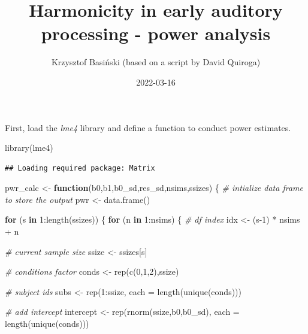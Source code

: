 \documentclass[
]{article}
\title{Harmonicity in early auditory processing - power analysis}
\author{Krzysztof Basiński (based on a script by David Quiroga)}
\date{2022-03-16}
\newenvironment{Shaded}{\begin{snugshade}}{\end{snugshade}}
\newcommand{\AttributeTok}[1]{\textcolor[rgb]{0.77,0.63,0.00}{#1}}
\newcommand{\CommentTok}[1]{\textcolor[rgb]{0.56,0.35,0.01}{\textit{#1}}}
\newcommand{\ControlFlowTok}[1]{\textcolor[rgb]{0.13,0.29,0.53}{\textbf{#1}}}
\newcommand{\DecValTok}[1]{\textcolor[rgb]{0.00,0.00,0.81}{#1}}
\newcommand{\FunctionTok}[1]{\textcolor[rgb]{0.00,0.00,0.00}{#1}}
\newcommand{\NormalTok}[1]{#1}
\newcommand{\OtherTok}[1]{\textcolor[rgb]{0.56,0.35,0.01}{#1}}
\newcommand{\SpecialCharTok}[1]{\textcolor[rgb]{0.00,0.00,0.00}{#1}}
\begin{document}
\maketitle

First, load the \emph{lme4} library and define a function to conduct
power estimates.

\begin{Shaded}
\begin{Highlighting}[]
\FunctionTok{library}\NormalTok{(lme4)}
\end{Highlighting}
\end{Shaded}

\begin{verbatim}
## Loading required package: Matrix
\end{verbatim}

\begin{Shaded}
\begin{Highlighting}[]
\NormalTok{pwr\_calc }\OtherTok{\textless{}{-}} \ControlFlowTok{function}\NormalTok{(b0,b1,b0\_sd,res\_sd,nsims,ssizes) \{}
  \CommentTok{\# intialize data frame to store the output }
\NormalTok{  pwr }\OtherTok{\textless{}{-}} \FunctionTok{data.frame}\NormalTok{() }
  
  \ControlFlowTok{for}\NormalTok{ (s }\ControlFlowTok{in} \DecValTok{1}\SpecialCharTok{:}\FunctionTok{length}\NormalTok{(ssizes)) \{}
    \ControlFlowTok{for}\NormalTok{ (n }\ControlFlowTok{in} \DecValTok{1}\SpecialCharTok{:}\NormalTok{nsims) \{}
      \CommentTok{\# df index}
\NormalTok{      idx }\OtherTok{\textless{}{-}}\NormalTok{ (s}\DecValTok{{-}1}\NormalTok{) }\SpecialCharTok{*}\NormalTok{ nsims }\SpecialCharTok{+}\NormalTok{ n}
      
      \CommentTok{\# current sample size}
\NormalTok{      ssize }\OtherTok{\textless{}{-}}\NormalTok{ ssizes[s]}
      
      \CommentTok{\# conditions factor}
\NormalTok{      conds }\OtherTok{\textless{}{-}} \FunctionTok{rep}\NormalTok{(}\FunctionTok{c}\NormalTok{(}\DecValTok{0}\NormalTok{,}\DecValTok{1}\NormalTok{,}\DecValTok{2}\NormalTok{),ssize)}
      
      \CommentTok{\# subject id\textquotesingle{}s}
\NormalTok{      subs }\OtherTok{\textless{}{-}} \FunctionTok{rep}\NormalTok{(}\DecValTok{1}\SpecialCharTok{:}\NormalTok{ssize, }\AttributeTok{each =} \FunctionTok{length}\NormalTok{(}\FunctionTok{unique}\NormalTok{(conds)))}
      
      \CommentTok{\# add intercept}
\NormalTok{      intercept }\OtherTok{\textless{}{-}} \FunctionTok{rep}\NormalTok{(}\FunctionTok{rnorm}\NormalTok{(ssize,b0,b0\_sd), }\AttributeTok{each =} \FunctionTok{length}\NormalTok{(}\FunctionTok{unique}\NormalTok{(conds)))}
      

\end{Highlighting}
\end{Shaded}
\end{document}
